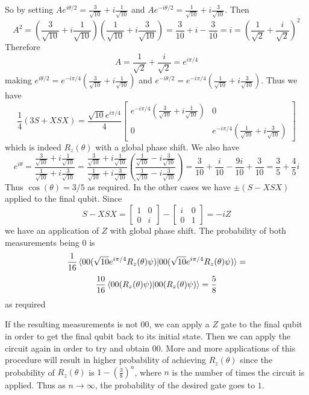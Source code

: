 So by setting $Ae^{i\theta/2} = \frac{3}{\sqrt{10}}+i\frac{1}{\sqrt{10}}$ and $ Ae^{-i\theta/2} =\frac{1}{\sqrt{10}}+i\frac{3}{\sqrt{10}} $. Then \[A^2 = \left(\frac{3}{\sqrt{10}}+i\frac{1}{\sqrt{10}}\right)\left(\frac{1}{\sqrt{10}}+i\frac{3}{\sqrt{10}}\right) = \frac{3}{10} + i - \frac{3}{10} = i= \left(\frac{1}{\sqrt{2}} +\frac{i}{\sqrt{2}}\right)^2\]
Therefore 
\[A = \frac{1}{\sqrt{2}}+\frac{i}{\sqrt{2}} = e^{i\pi/4}\]
making $ e^{i\theta/2} =e^{-i\pi/4}(\frac{3}{\sqrt{10}}+i\frac{1}{\sqrt{10}}) $ and $ e^{-i\theta/2} = e^{-i\pi/4}(\frac{1}{\sqrt{10}}+i\frac{3}{\sqrt{10}})$. Thus we have
\[\frac{1}{4}(3S + XSX) = \frac{\sqrt{10}e^{i\pi/4}}{4}\begin{bmatrix}
    e^{-i\pi/4}\left(\frac{3}{\sqrt{10}}+i\frac{1}{\sqrt{10}}\right) & 0 \\
    0 & e^{-i\pi/4}\left(\frac{1}{\sqrt{10}}+i\frac{3}{\sqrt{10}}\right)
\end{bmatrix}\]
which is indeed $R_z(\theta)$ with a global phase shift.
We also have \[e^{i\theta} =\frac{\frac{3}{\sqrt{10}}+i\frac{1}{\sqrt{10}}}{\frac{1}{\sqrt{10}}+i\frac{3}{\sqrt{10}}} = \frac{\frac{3}{\sqrt{10}}+i\frac{1}{\sqrt{10}}}{\frac{1}{\sqrt{10}}+i\frac{3}{\sqrt{10}}} \left(\frac{\frac{1}{\sqrt{10}}-i\frac{3}{\sqrt{10}}}{\frac{1}{\sqrt{10}}-i\frac{3}{\sqrt{10}}}\right) = \frac{3}{10} + \frac{i}{10} -\frac{9i}{10} + \frac{3}{10} = \frac{3}{5}+\frac{4}{5}i \]
Thus $\cos(\theta) = 3/5$ as required. In the other cases we have $\pm(S-XSX)$ applied to the final qubit. Since
\[S-XSX = \begin{bmatrix}
    1 & 0 \\
    0 & i
\end{bmatrix} - \begin{bmatrix}
    i & 0 \\
    0 & 1
\end{bmatrix} = -iZ\]
we have an application of $Z$ with global phase shift. The probability of both measurements being $0$ is \[\frac{1}{16}\braket{00(\sqrt{10}e^{i\pi/4}R_z(\theta)\psi)|00(\sqrt{10}e^{i\pi/4}R_z(\theta)\psi)} =\]\[ \frac{10}{16}\braket{00(R_z(\theta)\psi)|00(R_z(\theta)\psi)} = \frac{5}{8}\]
as required

If the resulting measurements is not $00$, we can apply a $Z$ gate to the final qubit in order to get the final qubit back to its initial state. Then we can apply the circuit again in order to try and obtain $00$. More and more applications of this procedure will result in higher probability of achieving $R_z(\theta)$ since the probability of $R_z(\theta)$ is $1-(\frac{3}{8})^n$, where $n$ is the number of times the circuit is applied. Thus as $n\rightarrow \infty$, the probability of the desired gate goes to $1$.





